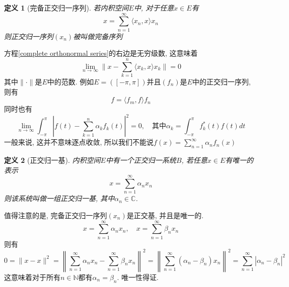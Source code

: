 \documentclass[a4paper,11pt]{article}
\newtheorem{definition}{\hspace{2em}定义}[section]
\begin{document}
\begin{definition}[完备正交归一序列]
  若内积空间$E$中, 对于任意$x\in E$有
  \begin{equation}\label{complete orthonormal series}
    x=\sum_{n=1}^{\infty}\langle x_n,x\rangle x_n
  \end{equation}
  则正交归一序列$(x_n)$被叫做完备序列
\end{definition}
方程\eqref{complete orthonormal series}的右边是无穷级数, 这意味着
\begin{equation*}
  \lim_{n\to\infty}\|x-\sum_{k=1}^{n}\langle x_k,x\rangle x_k\|=0
\end{equation*}
其中$\|\cdot\|$是$E$中的范数. 例如$E=([-\pi,\pi])$并且$(f_n)$是$E$中的正交归一序列, 则有
\begin{equation*}
  f=\langle f_m,f\rangle f_n
\end{equation*}
同时也有
\begin{equation*}
  \lim_{n\to\infty}\int_{-\pi}^{\pi}\left|f(t)-\sum_{k=1}^{n}\alpha_k f_k(t)\right|^2=0,\quad \text{其中}\alpha_k=\int_{-\pi}^{\pi}f_k^*(t)f(t)dt
\end{equation*}
一般来说, 这并不意味逐点收敛, 所以我们不能说$f(x)=\sum_{n=1}^{\infty}\alpha_n f_n(x)$
\begin{definition}[正交归一基]
  内积空间$E$中有一个正交归一系统$B$, 若任意$x\in E$有唯一的表示
  \begin{equation*}
    x=\sum_{n=1}^{\infty}\alpha_n x_n
  \end{equation*}
  则该系统叫做一组正交归一基, 其中$\alpha_n\in \mathbb{C}$.
\end{definition}
值得注意的是, 完备正交归一序列$(x_n)$是正交基, 并且是唯一的.
\begin{equation*}
  x=\sum_{n=1}^{\infty}\alpha_n x_n,\quad x=\sum_{n=1}^{\infty}\beta_n x_n
\end{equation*}
则有
\begin{equation*}
  0=\|x-x\|^2=\left\|\sum_{n=1}^{\infty}\alpha_n x_n-\sum_{n=1}^{\infty}\beta_n x_n\right\|^2=\left\|\sum_{n=1}^{\infty}(\alpha_n-\beta_n)x_n\right\|^2=\sum_{n=1}^{\infty}|\alpha_n-\beta_n|^2
\end{equation*}
这意味着对于所有$n\in\mathbb{N}$都有$\alpha_n=\beta_n$. 唯一性得证.
\end{document}
